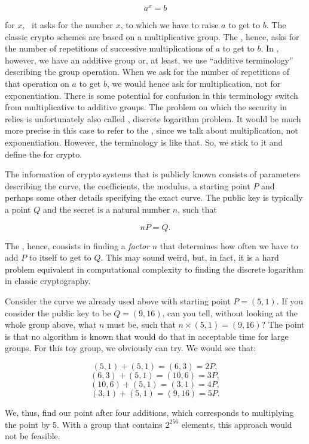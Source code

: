 \documentclass[tikz]{scrreprt}
\begin{document}
\[
a^x = b
\]

for $x$, \ie\ it asks for the number $x$,
to which we have to raise $a$ to get to $b$.
The classic crypto schemes are based on
a multiplicative group. The ,
hence, asks for the number of repetitions
of successive multiplications of $a$ to get to $b$.
In , however, we have an additive group or,
at least, we use ``additive terminology'' describing
the group operation. When we ask for the number
of repetitions of that operation on $a$ to get $b$,
we would hence ask for multiplication, not
for exponentiation. There is some potential 
for confusion in this terminology switch
from multiplicative to additive groups.
The problem on which the security in  relies
is unfortunately also called , 
discrete logarithm problem.
It would be much more precise in this case to refer to the
, since we talk about
multiplication, not exponentiation.
However, the terminology is like that.
So, we stick to it and define the 
for  crypto.

The information of  crypto systems
that is publicly known 
consists of parameters describing the curve,
the coefficients, the modulus, a starting point $P$ and perhaps
some other details specifying the exact curve.
The public key is typically a point $Q$ and the 
secret is a natural number $n$, such that

\begin{equation}
nP = Q.
\end{equation}

The , hence, consists in finding
a \emph{factor} $n$ that determines how often
we have to add $P$ to itself to get to $Q$.
This may sound weird, but, in fact, it is
a hard problem equivalent in computational complexity
to finding the discrete logarithm in classic
cryptography.

Consider the curve we already used above
with starting point $P=(5,1)$. If you consider the public
key to be $Q=(9,16)$, can you tell, without
looking at the whole group above, what $n$ must be,
such that $n\times (5,1) = (9,16)$?
The point is that no algorithm is known
that would do that in acceptable time
for large groups.
For this toy group, we obviously can try.
We would see that:

\[
(5,1) + (5,1) = (6,3)  = 2P,
\]\[
(6,3) + (5,1) = (10,6) = 3P,
\]\[
(10,6) + (5,1) = (3,1) = 4P,
\]\[
(3,1) + (5,1) = (9,16) = 5P.
\]

We, thus, find our point after four additions,
which corresponds to multiplying the point by 5.
With a group that contains $2^{256}$ elements,
this approach would not be feasible.
\end{document}
